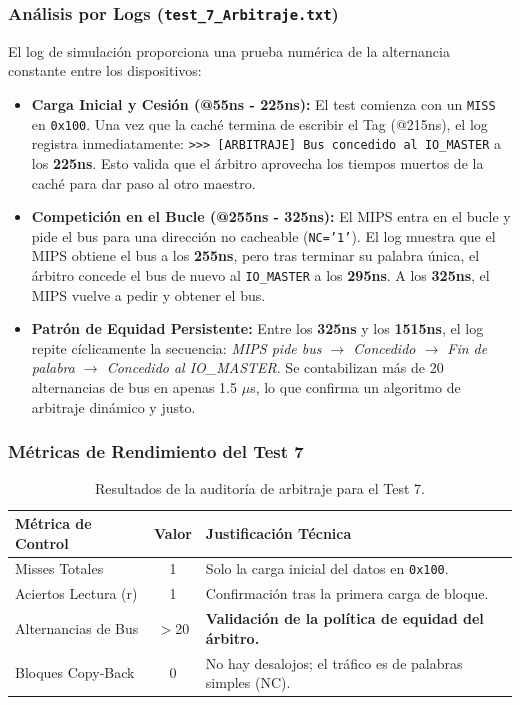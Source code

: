 \documentclass[12pt,a4paper]{article}
\begin{document}
\subsubsection*{Análisis por Logs (\texttt{test\_7\_Arbitraje.txt})}

El log de simulación proporciona una prueba numérica de la alternancia constante entre los dispositivos:

\begin{itemize}
    \item \textbf{Carga Inicial y Cesión (@55ns - 225ns):} El test comienza con un \texttt{MISS} en \texttt{0x100}. Una vez que la caché termina de escribir el Tag (@215ns), el log registra inmediatamente: \texttt{>>> [ARBITRAJE] Bus concedido al IO\_MASTER} a los \textbf{225ns}. Esto valida que el árbitro aprovecha los tiempos muertos de la caché para dar paso al otro maestro.
    
    \item \textbf{Competición en el Bucle (@255ns - 325ns):} El MIPS entra en el bucle y pide el bus para una dirección no cacheable (\texttt{NC='1'}). El log muestra que el MIPS obtiene el bus a los \textbf{255ns}, pero tras terminar su palabra única, el árbitro concede el bus de nuevo al \texttt{IO\_MASTER} a los \textbf{295ns}. A los \textbf{325ns}, el MIPS vuelve a pedir y obtener el bus.
    
    \item \textbf{Patrón de Equidad Persistente:} Entre los \textbf{325ns} y los \textbf{1515ns}, el log repite cíclicamente la secuencia: \textit{MIPS pide bus $\rightarrow$ Concedido $\rightarrow$ Fin de palabra $\rightarrow$ Concedido al IO\_MASTER}. Se contabilizan más de 20 alternancias de bus en apenas 1.5 $\mu$s, lo que confirma un algoritmo de arbitraje dinámico y justo.
\end{itemize}

\subsubsection{Métricas de Rendimiento del Test 7}

\begin{table}[H]
\centering
\small
\renewcommand{\arraystretch}{1.2}
\begin{tabular}{|l|c|l|}
\hline
\rowcolor[HTML]{EFEFEF} 
\textbf{Métrica de Control} & \textbf{Valor} & \textbf{Justificación Técnica} \\ \hline
Misses Totales & 1 & Solo la carga inicial del datos en \texttt{0x100}. \\ \hline
Aciertos Lectura (r) & 1 & Confirmación tras la primera carga de bloque. \\ \hline
Alternancias de Bus & $>$20 & \textbf{Validación de la política de equidad del árbitro.} \\ \hline
Bloques Copy-Back & 0 & No hay desalojos; el tráfico es de palabras simples (NC). \\ \hline
\end{tabular}
\caption{Resultados de la auditoría de arbitraje para el Test 7.}
\label{tab:audit_test7}
\end{table}
\end{document}
